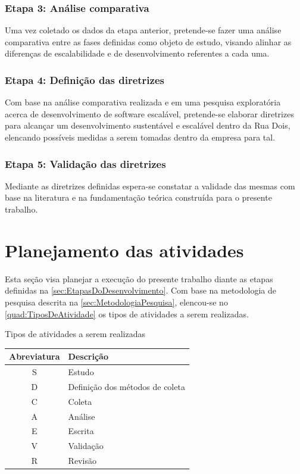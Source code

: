 \subsubsection{Etapa 3: Análise comparativa}

Uma vez coletado os dados da etapa anterior, pretende-se fazer uma análise comparativa
entre as fases definidas como objeto de estudo, visando alinhar as diferenças de
escalabilidade e de desenvolvimento referentes a cada uma.

\subsubsection{Etapa 4: Definição das diretrizes}

Com base na análise comparativa realizada e em uma pesquisa exploratória acerca de
desenvolvimento de software escalável, pretende-se elaborar diretrizes para alcançar
um desenvolvimento sustentável e escalável dentro da Rua Dois, elencando possíveis
medidas a serem tomadas dentro da empresa para tal.

\subsubsection{Etapa 5: Validação das diretrizes}

Mediante as diretrizes definidas espera-se constatar a validade das mesmas com base
na literatura e na fundamentação teórica construída para o presente trabalho.

\section{Planejamento das atividades}

Esta seção visa planejar a execução do presente trabalho diante as etapas definidas
na \autoref{sec:EtapasDoDesenvolvimento}. Com base na metodologia de pesquisa descrita
na \autoref{sec:MetodologiaPesquisa}, elencou-se no \autoref{quad:TiposDeAtividade}
os tipos de atividades a serem realizadas.

\begin{quadro}
    \caption{Tipos de atividades a serem realizadas\label{quad:TiposDeAtividade}}
    \begin{tabular}{ | c | l | }
    \hline
    \textbf{Abreviatura} &
        \textbf{Descrição} \\ \hline
        S & Estudo \\ \hline
        D & Definição dos métodos de coleta \\ \hline
        C & Coleta \\ \hline
        A & Análise \\ \hline
        E & Escrita \\ \hline
        V & Validação \\ \hline
        R & Revisão \\ \hline
    \end{tabular}
\end{quadro}

